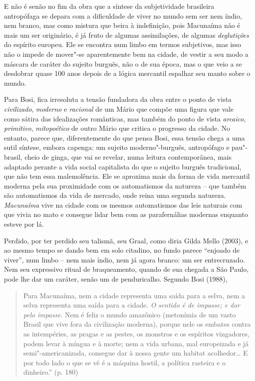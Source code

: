 {E não é senão no fim da obra que a síntese da subjetividade brasileira
antropófaga se depara com a dificuldade de viver no mundo sem ser nem
índio, nem branco, mas como mistura que beira à indefinição, pois
Macunaíma não é mais um ser originário, é já fruto de algumas
assimilações, de algumas \emph{deglutições} do espírito europeu. Ele se
encontra num limbo em termos subjetivos, mas isso não o impede de
mover"-se aparentemente bem na cidade, de vestir a seu modo a máscara de
caráter do sujeito burguês, não o de sua época, mas o que veio a se
desdobrar quase 100 anos depois de a lógica mercantil espalhar seu manto
sobre o mundo.

Para Bosi, fica irresoluta a tensão fundadora da obra entre o ponto de
vista \emph{civilizado}, \emph{moderno} e \emph{racional} de um Mário
que compõe uma figura que vale como sátira das idealizações românticas,
mas também do ponto de vista \emph{arcaico}, \emph{primitivo},
\emph{mitopoético} de outro Mário que critica o progresso da cidade. No
entanto, parece que, diferentemente do que pensa Bosi, essa tensão chega
a uma sutil síntese, embora capenga: um sujeito moderno"-burguês,
antropófago e pau"-brasil, cheio de ginga, que vai se revelar, numa
leitura contemporânea, mais adaptado perante a vida social capitalista
do que o sujeito burguês tradicional, que não tem essa malemolência. Ele
se aproxima mais da forma de vida mercantil moderna pela sua proximidade
com os automatismos da natureza -- que também são automatismos da vida
de mercado, onde reina uma segunda natureza. \emph{Macunaíma} vive na
cidade com os mesmos automatismos das leis naturais com que vivia no
mato e consegue lidar bem com as parafernálias modernas enquanto esteve
por lá.

Perdido, por ter perdido seu talismã, seu Graal, como diria Gilda Mello
(2003), e ao mesmo tempo se dando bem em solo citadino, no fundo parece
``enjoado de viver'', num limbo -- nem mais índio, nem já agora branco:
um ser entrecruzado. Nem seu expressivo ritual de braqueamento, quando de sua
chegada a São Paulo, pode lhe dar um caráter, senão um de penduricalho.
Segundo Bosi (1988),

\begin{quote}
Para Macunaíma, nem a cidade representa uma saída para a selva, nem a
selva representa uma saída para a cidade. \emph{O sentido é de impasse;
e dor pelo impasse}. Nem é feliz o mundo amazônico (metonímia de um
vasto Brasil que vive fora da civilização moderna), porque nele os
embates contra as intempéries, as pragas e as pestes, os monstros e os
espíritos vingadores, podem levar à míngua e à morte; nem a vida urbana,
mal europeizada e já semi"-americanizada, consegue dar à nossa gente um
habitat acolhedor\ldots{} E por todo lado o que se vê é a máquina hostil, a
política rasteira e o dinheiro.'' (p. 180)
\end{quote}

}
